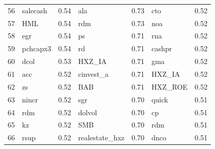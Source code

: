 \begin{footnotesize}
\begin{longtable}{rlc|lc|lc}
		56                        & salecash                    & 0.54                          & ala                         & 0.73                          & cto                               & 0.52           \\
		57                        & HML                         & 0.54                          & rdm                         & 0.73                          & noa                               & 0.52           \\
		58                        & egr                         & 0.54                          & ps                          & 0.71                          & rna                               & 0.52           \\
		59                        & pchcapx3                    & 0.54                          & rd                          & 0.71                          & cashpr                            & 0.52           \\
		60                        & dcol                        & 0.53                          & HXZ\_IA                     & 0.71                          & gma                               & 0.52           \\
		61                        & acc                         & 0.52                          & cinvest\_a                  & 0.71                          & HXZ\_IA                           & 0.52           \\
		62                        & zs                          & 0.52                          & BAB                         & 0.71                          & HXZ\_ROE                          & 0.52           \\
		63                        & nincr                       & 0.52                          & sgr                         & 0.70                          & quick                             & 0.51           \\
		64                        & rdm                         & 0.52                          & dolvol                      & 0.70                          & cp                                & 0.51           \\
		65                        & kz                          & 0.52                          & SMB                         & 0.70                          & rdm                               & 0.51           \\
		66                        & rsup                        & 0.52                          & realestate\_hxz             & 0.70                          & dnco                              & 0.51           \\

\end{longtable}
\end{footnotesize}

